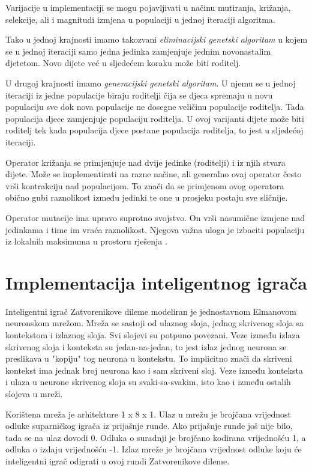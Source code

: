 \documentclass[zavrsnirad]{fer}
\begin{document}
		Varijacije u implementaciji se mogu pojavljivati u načinu mutiranja, križanja, selekcije, ali i magnitudi izmjena u populaciji u jednoj iteraciji algoritma. 
		
		Tako u jednoj krajnosti imamo takozvani \textit{eliminacijski genetski algoritam} u kojem se u jednoj iteraciji samo jedna jedinka zamjenjuje jednim novonastalim djetetom. Novo dijete već u sljedećem koraku može biti roditelj.
		
		U drugoj krajnosti imamo \textit{generacijski genetski algoritam}. U njemu se u jednoj iteraciji iz jedne populacije biraju roditelji čija se djeca spremaju u novu populaciju sve dok nova populacije ne dosegne veličinu populacije roditelja. Tada populacija djece zamjenjuje populaciju roditelja. U ovoj varijanti dijete može biti roditelj tek kada populacija djece postane populacija roditelja, to jest u sljedećoj iteraciji. \cite{skriptaEvolucijskoRacunarstvo}
		
		Operator križanja se primjenjuje nad dvije jedinke (roditelji) i iz njih stvara dijete. Može se implementirati na razne načine, ali generalno ovaj operator često vrši kontrakciju nad populacijom. To znači da se primjenom ovog operatora obično gubi raznolikost između jedinki te one u prosjeku postaju sve sličnije. \cite{skriptaEvolucijskoRacunarstvo}
		
		Operator mutacije ima upravo suprotno svojstvo. On vrši nasumične izmjene nad jedinkama i time im vraća raznolikost. Njegova važna uloga je izbaciti populaciju iz lokalnih maksimuma u prostoru rješenja \cite{skriptaEvolucijskoRacunarstvo}.
	
\chapter{Implementacija inteligentnog igrača}
\label{pog:Implementacija}

	Inteligentni igrač Zatvorenikove dileme modeliran je jednostavnom Elmanovom neuronskom mrežom. Mreža se sastoji od ulaznog sloja, jednog skrivenog sloja sa kontekstom i izlaznog sloja. Svi slojevi su potpuno povezani. Veze između izlaza skrivenog sloja i konteksta su jedan-na-jedan, to jest izlaz jednog neurona se preslikava u "kopiju" tog neurona u kontekstu. To implicitno znači da skriveni kontekst ima jednak broj neurona kao i sam skriveni sloj. Veze između konteksta i ulaza u neurone skrivenog sloja su svaki-sa-svakim, isto kao i između ostalih slojeva u mreži.
	
	Korištena mreža je arhitekture 1 x 8 x 1. Ulaz u mrežu je brojčana vrijednost odluke suparničkog igrača iz prijašnje runde. Ako prijašnje runde još nije bilo, tada se na ulaz dovodi 0. Odluka o suradnji je brojčano kodirana vrijednošću 1, a odluka o izdaju vrijednošću -1. Izlaz mreže je brojčana vrijednost odluke koju će inteligentni igrač odigrati u ovoj rundi Zatvorenikove dileme.
\end{document}

